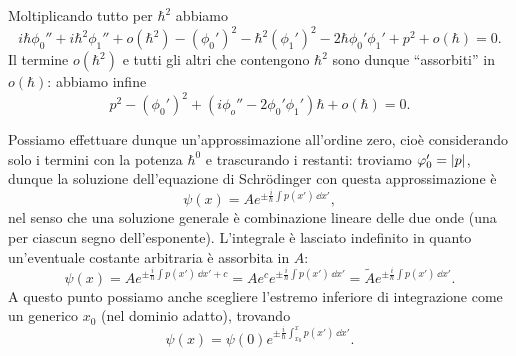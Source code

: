 Moltiplicando tutto per $\hbar^2$ abbiamo
\begin{equation}
	i\hbar\phi_0''+i\hbar^2\phi_1''+o(\hbar^2)-(\phi_0')^2-\hbar^2(\phi_1')^2-2\hbar\phi_0'\phi_1'+p^2+o(\hbar)=0.
\end{equation}
Il termine $o(\hbar^2)$ e tutti gli altri che contengono $\hbar^2$ sono dunque ``assorbiti'' in $o(\hbar)$: abbiamo infine
\begin{equation}
	p^2-(\phi_0')^2+(i\phi_o''-2\phi_0'\phi_1')\hbar+o(\hbar)=0.
	\label{eq:WKB-schroedinger-approssimata}
\end{equation}

Possiamo effettuare dunque un'approssimazione all'ordine zero, cioè considerando solo i termini con la potenza $\hbar^0$ e trascurando i restanti: troviamo $\varphi_0'=\lvert p\rvert$, dunque la soluzione dell'equazione di Schr\"odinger con questa approssimazione è
\begin{equation}
	\psi(x)=Ae^{\pm\frac{i}{\hbar}\int p(x')\,\dd x'},
	\label{eq:soluzione-WKB-ordine-0}
\end{equation}
nel senso che una soluzione generale è combinazione lineare delle due onde (una per ciascun segno dell'esponente).
L'integrale è lasciato indefinito in quanto un'eventuale costante arbitraria è assorbita in $A$:
\begin{equation}
	\psi(x)=Ae^{\pm\frac{i}{\hbar}\int p(x')\,\dd x'+c}=Ae^ce^{\pm\frac{i}{\hbar}\int p(x')\,\dd x'}=\tilde{A}e^{\pm\frac{i}{\hbar}\int p(x')\,\dd x'}.
\end{equation}
A questo punto possiamo anche scegliere l'estremo inferiore di integrazione come un generico $x_0$ (nel dominio adatto), trovando
\begin{equation}
	\psi(x)=\psi(0)e^{\pm\frac{i}{\hbar}\int_{x_0}^x p(x')\,\dd x'}.
\end{equation}

